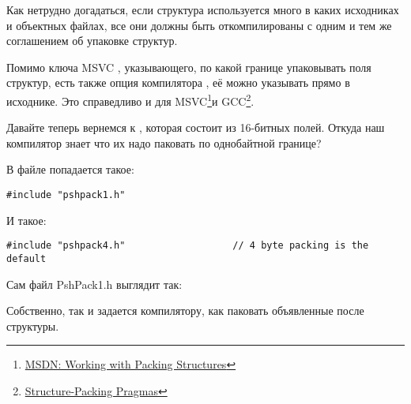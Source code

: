 Как нетрудно догадаться, если структура используется много в каких исходниках и объектных файлах, 
все они должны быть откомпилированы с одним и тем же соглашением об упаковке структур.

\newcommand{\FNURLMSDNZP}{\footnote{\href{http://go.yurichev.com/17067}
{MSDN: Working with Packing Structures}}}
\newcommand{\FNURLGCCPC}{\footnote{\href{http://go.yurichev.com/17068}
{Structure-Packing Pragmas}}}

Помимо ключа MSVC , указывающего, по какой границе упаковывать поля структур, есть также 
опция компилятора , её можно указывать прямо в исходнике. 
Это справедливо и для MSVC\FNURLMSDNZP и GCC\FNURLGCCPC{}.

Давайте теперь вернемся к , которая состоит из 16-битных полей. 
Откуда наш компилятор знает что их надо паковать по однобайтной границе?

В файле  попадается такое:

\begin{lstlisting}[caption=WinNT.h,style=customc]
#include "pshpack1.h"
\end{lstlisting}

И такое:

\begin{lstlisting}[caption=WinNT.h,style=customc]
#include "pshpack4.h"                   // 4 byte packing is the default
\end{lstlisting}

Сам файл PshPack1.h выглядит так:



Собственно, так и задается компилятору, как паковать объявленные после  структуры.


